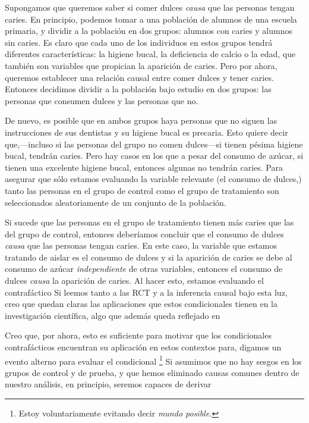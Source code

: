 {{Supongamos que queremos saber si comer dulces \emph{causa}
que las personas tengan caries. En principio, podemos tomar
a una población de alumnos de una escuela primaria, y
dividir a la población en dos grupos: alumnos con caries y
alumnos sin caries. Es claro que cada uno de los individuos
en estos grupos tendrá diferentes características: la
higiene bucal, la deficiencia de calcio o la edad, que
también son variables que propician la aparición de caries.
Pero por ahora, queremos establecer una relación causal
entre comer dulces y tener caries. Entonces decidimos
dividir a la población bajo estudio en dos grupos: las
personas que consumen dulces y las personas que no.

De nuevo, es posible que en ambos grupos haya personas que
no siguen las instrucciones de sus dentistas y su higiene
bucal es precaria. Esto quiere decir que,---incluso si las
personas del grupo no comen dulces---si tienen pésima
higiene bucal, tendrán caries. Pero hay
casos en los que a pesar del consumo de azúcar, si tienen
una excelente higiene bucal, entonces algunas no tendrán
caries. Para asegurar que sólo estamos evaluando la variable
relevante (el consumo de dulces,) tanto las personas en el
grupo de control como el grupo de tratamiento son
seleccionados aleatoriamente de un conjunto de la
población.

Si sucede que las personas en el grupo de tratamiento tienen
más caries que las del grupo de control, entonces deberíamos
concluir que el consumo de dulces \emph{causa} que las
personas tengan caries. En este caso, la variable que
estamos tratando de aislar es el consumo de dulces y si la
aparición de caries se debe al consumo de azúcar
\emph{independiente} de otras variables, entonces el consumo
de dulces \emph{causa} la aparición de caries. Al hacer
esto, estamos evaluando el contrafáctico  Si
leemos tanto a las RCT y a la inferencia causal bajo esta
luz, creo que quedan claras las aplicaciones que estos
condicionales tienen en la investigación científica, algo
que además queda reflejado en

Creo que, por ahora, esto es suficiente para motivar que los
condicionales contrafácticos encuentran su aplicación en
estos contextos para, digamos  un evento alterno
para evaluar el condicional \footnote{
	Estoy voluntariamente evitando decir \emph{mundo posible.}
}
Si asumimos que no hay sesgos en los grupos de control y
de prueba, y que hemos eliminado causas comunes dentro de
nuestro análisis, en principio, seremos capaces de derivar

}}
